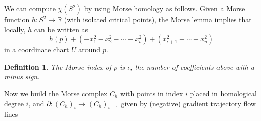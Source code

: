 \documentclass{amsart}
\newtheorem{definition}[theorem]{Definition}
\newcommand{\R}{\mathbb{R}}
\begin{document}
We can compute $\chi(S^2)$ by using Morse homology as follows. Given a Morse function $h: S^2 \rightarrow \R$ (with isolated critical points), the Morse lemma implies that locally, $h$ can be written as \[ h(p) + (-x_1^2 - x_2^2 - \cdots -x_\iota^2) + (x_{\iota+1}^2 + \cdots + x_n^2) \] in a coordinate chart $U$ around $p$. 

\begin{definition} The Morse index of $p$ is $\iota$, the number of coefficients above with a minus sign. 
\end{definition} 

Now we build the Morse complex $C_h$ with points in index $i$ placed in homological degree $i$, and $\partial: (C_h)_i \rightarrow (C_h)_{i-1}$ given by (negative) gradient trajectory flow lines 


\FloatBarrier
\end{document}

